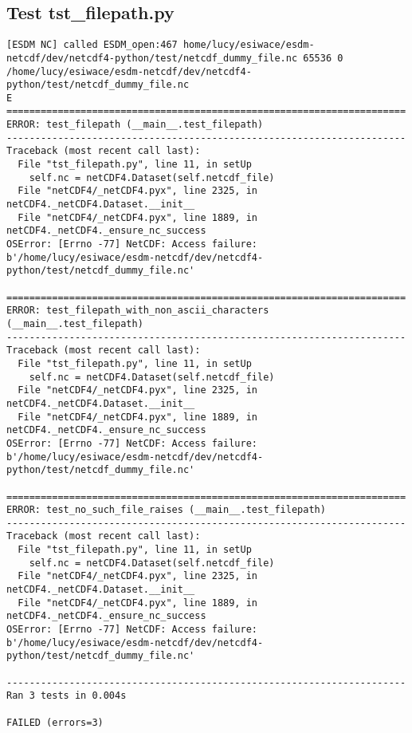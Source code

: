 \subsection{Test tst\_filepath.py}

\begin{verbatim}
[ESDM NC] called ESDM_open:467 home/lucy/esiwace/esdm-netcdf/dev/netcdf4-python/test/netcdf_dummy_file.nc 65536 0 /home/lucy/esiwace/esdm-netcdf/dev/netcdf4-python/test/netcdf_dummy_file.nc
E
======================================================================
ERROR: test_filepath (__main__.test_filepath)
----------------------------------------------------------------------
Traceback (most recent call last):
  File "tst_filepath.py", line 11, in setUp
    self.nc = netCDF4.Dataset(self.netcdf_file)
  File "netCDF4/_netCDF4.pyx", line 2325, in netCDF4._netCDF4.Dataset.__init__
  File "netCDF4/_netCDF4.pyx", line 1889, in netCDF4._netCDF4._ensure_nc_success
OSError: [Errno -77] NetCDF: Access failure: b'/home/lucy/esiwace/esdm-netcdf/dev/netcdf4-python/test/netcdf_dummy_file.nc'

======================================================================
ERROR: test_filepath_with_non_ascii_characters (__main__.test_filepath)
----------------------------------------------------------------------
Traceback (most recent call last):
  File "tst_filepath.py", line 11, in setUp
    self.nc = netCDF4.Dataset(self.netcdf_file)
  File "netCDF4/_netCDF4.pyx", line 2325, in netCDF4._netCDF4.Dataset.__init__
  File "netCDF4/_netCDF4.pyx", line 1889, in netCDF4._netCDF4._ensure_nc_success
OSError: [Errno -77] NetCDF: Access failure: b'/home/lucy/esiwace/esdm-netcdf/dev/netcdf4-python/test/netcdf_dummy_file.nc'

======================================================================
ERROR: test_no_such_file_raises (__main__.test_filepath)
----------------------------------------------------------------------
Traceback (most recent call last):
  File "tst_filepath.py", line 11, in setUp
    self.nc = netCDF4.Dataset(self.netcdf_file)
  File "netCDF4/_netCDF4.pyx", line 2325, in netCDF4._netCDF4.Dataset.__init__
  File "netCDF4/_netCDF4.pyx", line 1889, in netCDF4._netCDF4._ensure_nc_success
OSError: [Errno -77] NetCDF: Access failure: b'/home/lucy/esiwace/esdm-netcdf/dev/netcdf4-python/test/netcdf_dummy_file.nc'

----------------------------------------------------------------------
Ran 3 tests in 0.004s

FAILED (errors=3)
\end{verbatim}

